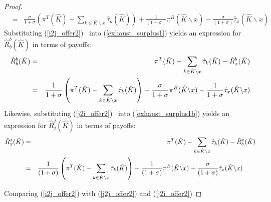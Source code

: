 \documentclass[12pt]{article} \usepackage{amsmath,amssymb,amsthm,geometry,graphicx,setspace,algorithm,algpseudocode,float}
\begin{document}
\begin{proof}
\begin{eqnarray}
 &=&\frac{\sigma }{1+\sigma }\left( \pi ^{T}(\hat{K%
})-\sum\limits_{k\in \hat{K}\backslash x} \hat{\tau}_{k}(\hat{K})\right) +\frac{1}{(1+\sigma )}\pi ^{B}(%
\hat{K}\backslash x)-\frac{\sigma }{(1+\sigma )}\hat{\tau}_{x}(\hat{K}%
\backslash x)  \label{j2i_offer2}
\end{eqnarray}%
Substituting (\ref{i2j_offer2}) \ into (\ref{exhaust_surplus1}) yields an expression for $\hat{R}_{b}^{b}(\hat{K})$ in terms of payoffs:
\begin{eqnarray}
\hat{R}_{b}^{b}(\hat{K}) &=&\pi ^{T}(\hat{K})-\sum\limits_{k\in \hat{K}\backslash x} \hat{\tau}_{k}(\hat{K})-\hat{R}_{x}^{b}(\hat{K})  \notag \\
&=&\frac{1}{1+\sigma }\left( \pi ^{T}(\hat{K})-\sum\limits_{k\in \hat{K}\backslash x} \hat{\tau}_{k}(\hat{K})\right)   \label{i2i_offer2} %
+\frac{\sigma }{1+\sigma }\pi ^{B}(\hat{K}\backslash x)-\frac{1}{1+\sigma }%
\hat{\tau}_{x}(\hat{K}\backslash x) %
\end{eqnarray}%
Likewise, substituting (\ref{j2i_offer2}) \ into (\ref{exhaust_surplus1b}) yields an
expression for $\hat{R}_{j}^{j}(\hat{K})$ in terms of payoffs:
\begin{eqnarray}
\hat{R}_{x}^{x}(\hat{K}) &=&\pi ^{T}(\hat{K})-\sum\limits_{k\in \hat{K}\backslash x} \hat{\tau}_{k}(\hat{K})-\hat{R}_{b}^{x}(\hat{K})  \notag \\
&=&\frac{1}{(1+\sigma )}\left(\pi ^{T}(\hat{K})-\sum\limits_{k\in \hat{K}\backslash x} \hat{\tau}_{k}(\hat{K})  \right)-\frac{1}{(1+\sigma )}\pi ^{B}(\hat{K}\backslash x)+\frac{\sigma }{%
(1+\sigma )}\hat{\tau}_{x}(\hat{K}\backslash x) \ \ \  \ \ \ \label{j2j_offer2} 
\end{eqnarray}
\par
Comparing (\ref{i2j_offer2}) with (\ref{j2j_offer2}) and (\ref{j2i_offer2})

\end{proof}
\end{document}
